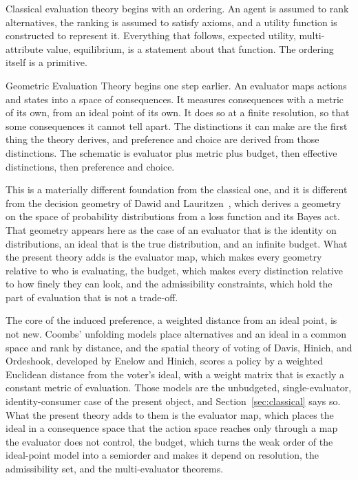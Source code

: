 \documentclass[11pt]{article}
\theoremstyle{definition}
\theoremstyle{remark}
\begin{document}
Classical evaluation theory begins with an ordering.
An agent is assumed to rank alternatives, the ranking is assumed to satisfy axioms, and a utility function is constructed to represent it.
Everything that follows, expected utility, multi-attribute value, equilibrium, is a statement about that function.
The ordering itself is a primitive.

Geometric Evaluation Theory begins one step earlier.
An evaluator maps actions and states into a space of consequences.
It measures consequences with a metric of its own, from an ideal point of its own.
It does so at a finite resolution, so that some consequences it cannot tell apart.
The distinctions it can make are the first thing the theory derives, and preference and choice are derived from those distinctions.
The schematic is evaluator plus metric plus budget, then effective distinctions, then preference and choice.

This is a materially different foundation from the classical one, and it is different from the decision geometry of Dawid and Lauritzen~\cite{dawid2005,dawid2007}, which derives a geometry on the space of probability distributions from a loss function and its Bayes act.
That geometry appears here as the case of an evaluator that is the identity on distributions, an ideal that is the true distribution, and an infinite budget.
What the present theory adds is the evaluator map, which makes every geometry relative to who is evaluating, the budget, which makes every distinction relative to how finely they can look, and the admissibility constraints, which hold the part of evaluation that is not a trade-off.

The core of the induced preference, a weighted distance from an ideal point, is not new.
Coombs' unfolding models place alternatives and an ideal in a common space and rank by distance, and the spatial theory of voting of Davis, Hinich, and Ordeshook, developed by Enelow and Hinich, scores a policy by a weighted Euclidean distance from the voter's ideal, with a weight matrix that is exactly a constant metric of evaluation.
Those models are the unbudgeted, single-evaluator, identity-consumer case of the present object, and Section~\ref{sec:classical} says so.
What the present theory adds to them is the evaluator map, which places the ideal in a consequence space that the action space reaches only through a map the evaluator does not control, the budget, which turns the weak order of the ideal-point model into a semiorder and makes it depend on resolution, the admissibility set, and the multi-evaluator theorems.
\end{document}
